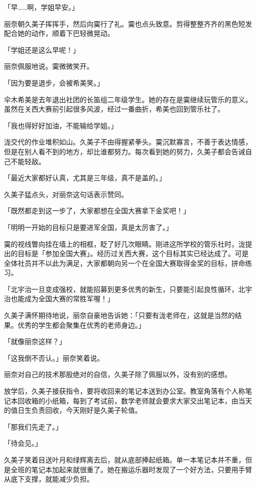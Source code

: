 \documentclass[UTF8]{ctexart}
\begin{document}
    「早……啊，学姐早安。」 

    丽奈朝久美子挥挥手，然后向霙行了礼。霙也点头致意。剪得整整齐齐的黑色短发配合她的动作，顺着下巴轻微晃动。 

    「学姐还是这么早呢！」 

    丽奈佩服地说。霙微微笑开。 

    「因为要是退步，会被希美笑。」 

    伞木希美是去年退出社团的长笛组二年级学生。她的存在是霙继续玩管乐的意义。虽然在关西大赛前引起很多风波，经过一番曲折，希美也回到管乐社了。 

    「我也得好好加油，不能输给学姐。」 

    泷交代的作业堆积如山。久美子不由得握紧拳头。霙沉默寡言，不善于表达情感，但是在别人看不到的地方，却比谁都努力。每次看到她的努力，久美子都会告诫自己不能轻敌。 

    「最近大家都好认真，尤其是三年级，真不是盖的。」 

    久美子猛点头，对丽奈这句话表示赞同。 

    「既然都走到这一步了，大家都想在全国大赛拿下金奖吧！」 

    「明明一开始的目标只是要进军全国，真是太厉害了。」 

    霙的视线瞥向挂在墙上的相框，眨了好几次眼睛。刚进这所学校的管乐社时，泷提出的目标是「参加全国大赛」。经历过关西大赛，这个目标其实已经达成了。可是全体社员并不以此为满足，大家都朝向另一个在全国大赛取得金奖的目标，拼命练习。 

    「北宇治一旦变成强校，就能招募到更多优秀的新生，只要能引起良性循环，北宇治也能成为全国大赛的常胜军喔！」 

    久美子满怀期待地说，丽奈自豪地告诉她：「只要有泷老师在，这就是当然的结果。优秀的学生都会聚集在优秀的老师身边。」 

    「就像丽奈这样？」 

    「这我倒不否认。」丽奈笑着说。 

    丽奈对自己的技术那股绝对的自信，久美子除了佩服以外，没有别的感想。 

    放学后，久美子接获指令，要将收回来的笔记本送到办公室。教室角落有个人称笔记本回收箱的小纸箱，每到了考试前，数学老师就会要求大家交出笔记本，由当天的值日生负责回收，今天刚好是久美子轮值。 

    「那我们先走了。」 

    「待会见。」 

    久美子笑着目送叶月和绿辉离去后，就从底部捧起纸箱。单一本笔记本并不重，但是全班的笔记本加起来就很重了。她在搬运乐器时发现了一个好方法，只要用手臂从底下支撑，就能减少负担。 
\end{document}
